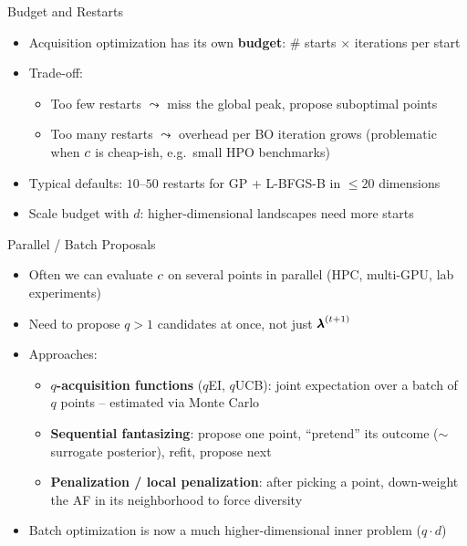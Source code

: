 \documentclass[main]{subfiles}
\begin{document}
\begin{frame}[t]{Budget and Restarts}
  \begin{itemize}
    \item Acquisition optimization has its own \textbf{budget}: \# starts $\times$ iterations per start
    \item Trade-off:
        \begin{itemize}
            \item Too few restarts $\leadsto$ miss the global peak, propose suboptimal points
            \item Too many restarts $\leadsto$ overhead per BO iteration grows (problematic when $c$ is cheap-ish, e.g.\ small HPO benchmarks)
        \end{itemize}
    \item Typical defaults: $10$--$50$ restarts for GP + L-BFGS-B in $\le 20$ dimensions
    \item Scale budget with $d$: higher-dimensional landscapes need more starts
  \end{itemize}
\end{frame}


\begin{frame}[t]{Parallel / Batch Proposals}
  \begin{itemize}
    \item Often we can evaluate $c$ on several points in parallel (HPC, multi-GPU, lab experiments)
    \item Need to propose $q > 1$ candidates at once, not just ${\pmb{\lambda}}^{(t+1)}$
    \item Approaches:
        \begin{itemize}
            \item \textbf{$q$-acquisition functions} ($q$EI, $q$UCB): joint expectation over a batch of $q$ points -- estimated via Monte Carlo
            \item \textbf{Sequential fantasizing}: propose one point, ``pretend'' its outcome ($\sim$ surrogate posterior), refit, propose next
            \item \textbf{Penalization / local penalization}: after picking a point, down-weight the AF in its neighborhood to force diversity
        \end{itemize}
    \item Batch optimization is now a much higher-dimensional inner problem ($q \cdot d$)
  \end{itemize}
\end{frame}
\end{document}
